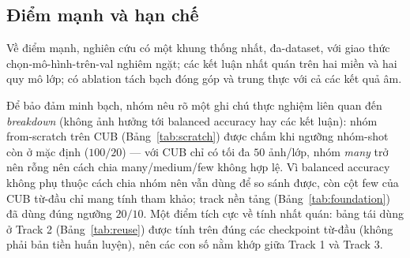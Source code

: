 \subsection{Điểm mạnh và hạn chế}
Về điểm mạnh, nghiên cứu có một khung thống nhất, đa-dataset, với giao thức chọn-mô-hình-trên-val
nghiêm ngặt; các kết luận nhất quán trên hai miền và hai quy mô lớp; có ablation tách bạch đóng góp
và trung thực với cả các kết quả âm.

Để bảo đảm minh bạch, nhóm nêu rõ một ghi chú thực nghiệm liên quan đến \emph{breakdown} (không ảnh
hưởng tới balanced accuracy hay các kết luận): nhóm from-scratch trên CUB (Bảng~\ref{tab:scratch})
được chấm khi ngưỡng nhóm-shot còn ở mặc định ($100/20$) --- với CUB chỉ có tối đa $50$ ảnh/lớp,
nhóm \emph{many} trở nên rỗng nên cách chia many/medium/few không hợp lệ. Vì balanced accuracy không
phụ thuộc cách chia nhóm nên vẫn dùng để so sánh được, còn cột few của CUB từ-đầu chỉ mang tính tham
khảo; track nền tảng (Bảng~\ref{tab:foundation}) đã dùng đúng ngưỡng $20/10$. Một điểm tích cực về
tính nhất quán: bảng tái dùng ở Track 2 (Bảng~\ref{tab:reuse}) được tính trên đúng các checkpoint
từ-đầu (không phải bản tiền huấn luyện), nên các con số nằm khớp giữa Track 1 và Track 3.
